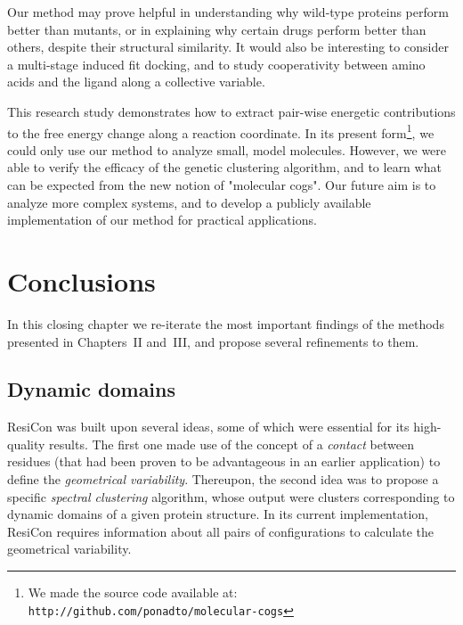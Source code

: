 \documentclass[a4paper,11pt,twoside]{book}%
\begin{document}
Our method may prove helpful in understanding why wild-type proteins perform better than mutants, or in explaining why certain drugs perform better than others, despite their structural similarity.
It would also be interesting to consider a multi-stage induced fit docking, and to study cooperativity between amino acids and the ligand along a collective variable.

This research study demonstrates how to extract pair-wise energetic contributions to the free energy change along a reaction coordinate.
In its present form\footnote{We made the source code available at: \texttt{http://github.com/ponadto/molecular-cogs}}, we could only use our method to analyze small, {\color{black}model} molecules.
However, {\color{black}we were able} to verify the efficacy of the genetic clustering algorithm, and to learn what can be expected from the new notion of "molecular cogs".
Our future aim is to analyze more complex systems, and to develop a publicly available implementation of our method for practical applications.




\chapter{Conclusions}

In this closing chapter we re-iterate the most important findings of the methods presented in Chapters~II and~III, and propose several refinements to them.

\section{Dynamic domains}

ResiCon was built upon several ideas, some of which were essential for its high-quality results.
The first one made use of the concept of a \emph{contact} between residues (that had been proven to be advantageous in an earlier application) to define the \emph{geometrical variability}.
Thereupon, the second idea was to propose a specific \emph{spectral clustering} algorithm, whose output were clusters corresponding to dynamic domains of a given protein structure.
In its current implementation, ResiCon requires information about all pairs of configurations to calculate the geometrical variability. 
\end{document}
